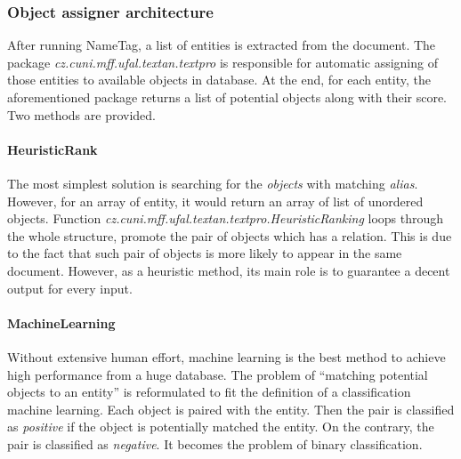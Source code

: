 \subsubsection{Object assigner architecture} 



After running NameTag, a list of entities is extracted from the document. The
package \emph{cz.cuni.mff.ufal.textan.textpro} is responsible for automatic
assigning of those entities to available objects in database. At the end, for 
each entity, the aforementioned package returns a list of potential objects along
with their score. Two methods are provided.

\paragraph{HeuristicRank}
The most simplest solution is searching for the \textit{objects} with matching 
\textit{alias}. However, for an array of entity, it would return an array of 
list of unordered objects.
Function \emph{cz.cuni.mff.ufal.textan.textpro.HeuristicRanking} loops through 
the whole structure, promote the pair of objects which has a relation. This is 
due to the fact that such pair of objects is more likely to appear in the same
document. However, as a heuristic method, its main role is to guarantee a decent
output for every input.


\paragraph{MachineLearning}
Without extensive human effort, machine learning is the best method to achieve
high performance from a huge database. The problem of ``matching potential objects
to an entity'' is reformulated to fit the definition of a classification machine 
learning. Each object is paired with the entity. Then the pair is classified as
\emph{positive} if the object is potentially matched the entity. On the contrary,
the pair is classified as \emph{negative}. It becomes the problem of binary 
classification.

